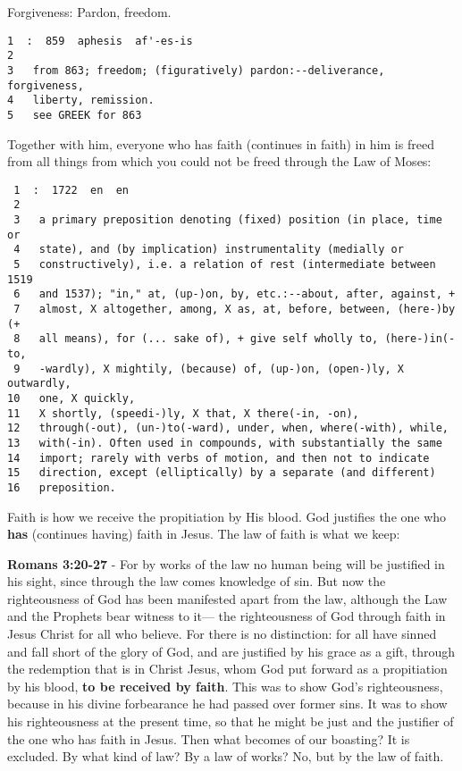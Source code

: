 \documentclass[11pt]{article}
\begin{document}
Forgiveness: Pardon, freedom.

\begin{verbatim}
1  :  859  aphesis  af'-es-is
2  
3   from 863; freedom; (figuratively) pardon:--deliverance, forgiveness,
4   liberty, remission.
5   see GREEK for 863
\end{verbatim}

Together with him, everyone who has faith (continues in faith) in him is freed from all things from which you could not be freed through the Law of Moses:

\begin{verbatim}
 1  :  1722  en  en
 2  
 3   a primary preposition denoting (fixed) position (in place, time or
 4   state), and (by implication) instrumentality (medially or
 5   constructively), i.e. a relation of rest (intermediate between 1519
 6   and 1537); "in," at, (up-)on, by, etc.:--about, after, against, +
 7   almost, X altogether, among, X as, at, before, between, (here-)by (+
 8   all means), for (... sake of), + give self wholly to, (here-)in(-to,
 9   -wardly), X mightily, (because) of, (up-)on, (open-)ly, X outwardly,
10   one, X quickly,
11   X shortly, (speedi-)ly, X that, X there(-in, -on),
12   through(-out), (un-)to(-ward), under, when, where(-with), while,
13   with(-in). Often used in compounds, with substantially the same
14   import; rarely with verbs of motion, and then not to indicate
15   direction, except (elliptically) by a separate (and different)
16   preposition.
\end{verbatim}

Faith is how we receive the propitiation by His blood. God justifies the one who \textbf{has} (continues having) faith in Jesus. The law of faith is what we keep:

\textbf{Romans 3:20-27} - For by works of the law no human being will be justified in his sight, since through the law comes knowledge of sin. But now the righteousness of God has been manifested apart from the law, although the Law and the Prophets bear witness to it— the righteousness of God through faith in Jesus Christ for all who believe. For there is no distinction: for all have sinned and fall short of the glory of God, and are justified by his grace as a gift, through the redemption that is in Christ Jesus, whom God put forward as a propitiation by his blood, \textbf{to be received by faith}. This was to show God's righteousness, because in his divine forbearance he had passed over former sins. It was to show his righteousness at the present time, so that he might be just and the justifier of the one who has faith in Jesus. Then what becomes of our boasting? It is excluded. By what kind of law? By a law of works? No, but by the law of faith.
\end{document}
